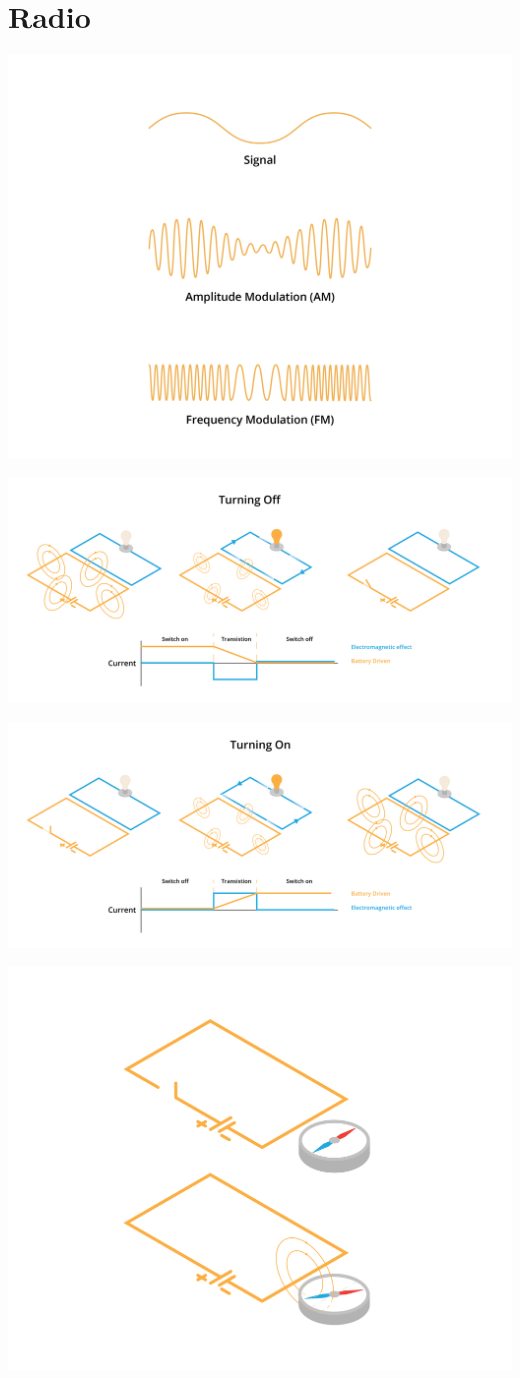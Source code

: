 \chapter{Radio}

\includegraphics[width=.75\textwidth]{amvsFm.png}

\includegraphics[width=.75\textwidth]{circuitEMArrow1.png}

\includegraphics[width=.75\textwidth]{circuitEMArrow2.png}

\includegraphics[width=.75\textwidth]{compass.png}

